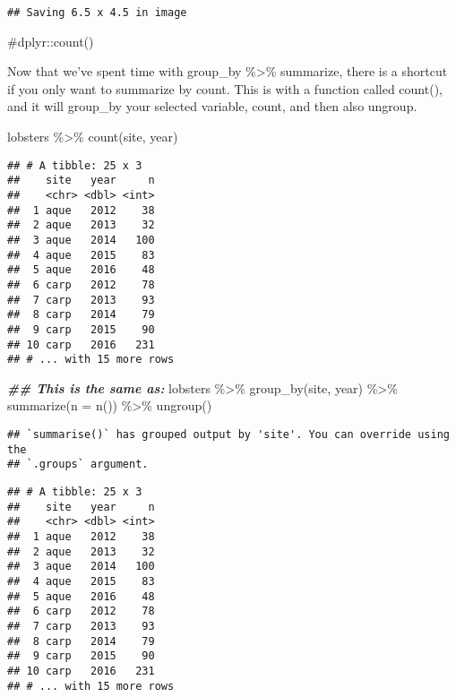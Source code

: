 \documentclass[
]{article}
\newenvironment{Shaded}{\begin{snugshade}}{\end{snugshade}}
\newcommand{\AttributeTok}[1]{\textcolor[rgb]{0.77,0.63,0.00}{#1}}
\newcommand{\DocumentationTok}[1]{\textcolor[rgb]{0.56,0.35,0.01}{\textbf{\textit{#1}}}}
\newcommand{\FunctionTok}[1]{\textcolor[rgb]{0.00,0.00,0.00}{#1}}
\newcommand{\NormalTok}[1]{#1}
\newcommand{\SpecialCharTok}[1]{\textcolor[rgb]{0.00,0.00,0.00}{#1}}
\begin{document}
\begin{verbatim}
## Saving 6.5 x 4.5 in image
\end{verbatim}

\#dplyr::count()

Now that we've spent time with group\_by \%\textgreater\% summarize,
there is a shortcut if you only want to summarize by count. This is with
a function called count(), and it will group\_by your selected variable,
count, and then also ungroup.

\begin{Shaded}
\begin{Highlighting}[]
\NormalTok{lobsters }\SpecialCharTok{\%\textgreater{}\%}
  \FunctionTok{count}\NormalTok{(site, year)}
\end{Highlighting}
\end{Shaded}

\begin{verbatim}
## # A tibble: 25 x 3
##    site   year     n
##    <chr> <dbl> <int>
##  1 aque   2012    38
##  2 aque   2013    32
##  3 aque   2014   100
##  4 aque   2015    83
##  5 aque   2016    48
##  6 carp   2012    78
##  7 carp   2013    93
##  8 carp   2014    79
##  9 carp   2015    90
## 10 carp   2016   231
## # ... with 15 more rows
\end{verbatim}

\begin{Shaded}
\begin{Highlighting}[]
\DocumentationTok{\#\# This is the same as:}
\NormalTok{lobsters }\SpecialCharTok{\%\textgreater{}\%}
  \FunctionTok{group\_by}\NormalTok{(site, year) }\SpecialCharTok{\%\textgreater{}\%} 
  \FunctionTok{summarize}\NormalTok{(}\AttributeTok{n =} \FunctionTok{n}\NormalTok{()) }\SpecialCharTok{\%\textgreater{}\%}
  \FunctionTok{ungroup}\NormalTok{()}
\end{Highlighting}
\end{Shaded}

\begin{verbatim}
## `summarise()` has grouped output by 'site'. You can override using the
## `.groups` argument.
\end{verbatim}

\begin{verbatim}
## # A tibble: 25 x 3
##    site   year     n
##    <chr> <dbl> <int>
##  1 aque   2012    38
##  2 aque   2013    32
##  3 aque   2014   100
##  4 aque   2015    83
##  5 aque   2016    48
##  6 carp   2012    78
##  7 carp   2013    93
##  8 carp   2014    79
##  9 carp   2015    90
## 10 carp   2016   231
## # ... with 15 more rows
\end{verbatim}
\end{document}
